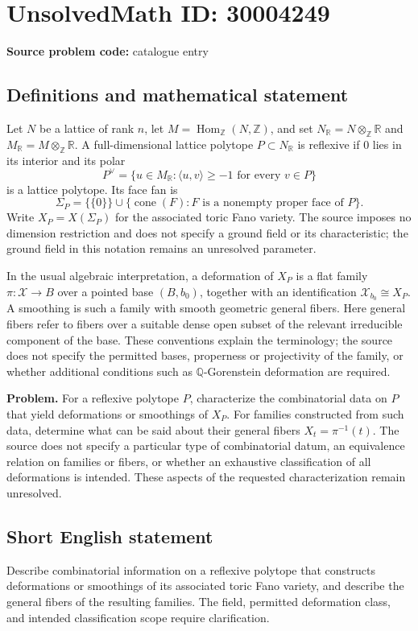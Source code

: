\documentclass[11pt]{article}
\newcommand{\Z}{\mathbb{Z}}
\newcommand{\Q}{\mathbb{Q}}
\newcommand{\R}{\mathbb{R}}
\begin{document}
\section*{UnsolvedMath ID: 30004249}
\textbf{Source problem code:} catalogue entry
\subsection{Definitions and mathematical statement}
Let \(N\) be a lattice of rank \(n\), let \(M=\operatorname{Hom}_{\Z}(N,\Z)\), and set \(N_{\R}=N\otimes_{\Z}\R\) and \(M_{\R}=M\otimes_{\Z}\R\). A full-dimensional lattice polytope \(P\subset N_{\R}\) is reflexive if \(0\) lies in its interior and its polar
\[
P^{\vee}=\{u\in M_{\R}:\langle u,v\rangle\geq -1\text{ for every }v\in P\}
\]
is a lattice polytope. Its face fan is
\[
\Sigma_P=\{\{0\}\}\cup\{\operatorname{cone}(F):F\text{ is a nonempty proper face of }P\}.
\]
Write \(X_P=X(\Sigma_P)\) for the associated toric Fano variety. The source imposes no dimension restriction and does not specify a ground field or its characteristic; the ground field in this notation remains an unresolved parameter.

In the usual algebraic interpretation, a deformation of \(X_P\) is a flat family \(\pi:\mathcal X\to B\) over a pointed base \((B,b_0)\), together with an identification \(\mathcal X_{b_0}\cong X_P\). A smoothing is such a family with smooth geometric general fibers. Here general fibers refer to fibers over a suitable dense open subset of the relevant irreducible component of the base. These conventions explain the terminology; the source does not specify the permitted bases, properness or projectivity of the family, or whether additional conditions such as \(\Q\)-Gorenstein deformation are required.

\textbf{Problem.} For a reflexive polytope \(P\), characterize the combinatorial data on \(P\) that yield deformations or smoothings of \(X_P\). For families constructed from such data, determine what can be said about their general fibers \(X_t=\pi^{-1}(t)\). The source does not specify a particular type of combinatorial datum, an equivalence relation on families or fibers, or whether an exhaustive classification of all deformations is intended. These aspects of the requested characterization remain unresolved.
\subsection{Short English statement}
Describe combinatorial information on a reflexive polytope that constructs deformations or smoothings of its associated toric Fano variety, and describe the general fibers of the resulting families. The field, permitted deformation class, and intended classification scope require clarification.
\end{document}
